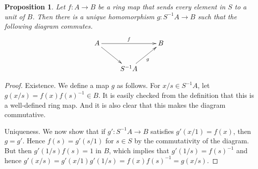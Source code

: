 \documentclass[10pt,a4paper]{amsart}
\theoremstyle{plain}
\newtheorem{proposition}[subsection]{Proposition}
\theoremstyle{definition}
\theoremstyle{remark}
\numberwithin{equation}{subsection}
\begin{document}
\begin{proposition}
\label{proposition-universal-property-localization}
Let $f : A \to B$ be a ring map that sends every element in $S$ to a unit
of $B$. Then there is a unique homomorphism $g : S^{-1}A \to B$ such
that the following diagram commutes.
$$
\xymatrix{
A \ar[rr]^{f} \ar[dr] & & B \\
& S^{-1}A \ar[ur]_g
}
$$
\end{proposition}

\begin{proof}
Existence. We define a map $g$ as follows. For $x/s\in S^{-1}A$, let
$g(x/s) = f(x)f(s)^{-1}\in B$. It is easily checked from the definition
that this is a well-defined ring map. And it is also clear that
this makes the diagram commutative.

\medskip\noindent
Uniqueness. We now show that if $g' : S^{-1}A \to B$
satisfies $g'(x/1) = f(x)$, then $g = g'$. Hence $f(s) = g'(s/1)$ for
$s \in S$ by the commutativity of the diagram. But then $g'(1/s)f(s) = 1$
in $B$, which implies that $g'(1/s) = f(s)^{-1}$ and hence
$g'(x/s) = g'(x/1)g'(1/s) = f(x)f(s)^{-1} = g(x/s)$.
\end{proof}
\end{document}
